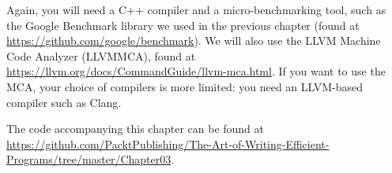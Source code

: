 Again, you will need a C++ compiler and a micro-benchmarking tool, such as the Google Benchmark library we used in the previous chapter (found at \url{https://github.com/google/benchmark}). We will also use the LLVM Machine Code Analyzer (LLVMMCA), found at \url{https://llvm.org/docs/CommandGuide/llvm-mca.html}. If you want to use the MCA, your choice of compilers is more limited: you need an LLVM-based compiler such as Clang.

The code accompanying this chapter can be found at \url{https://github.com/PacktPublishing/The-Art-of-Writing-Efficient-Programs/tree/master/Chapter03}.